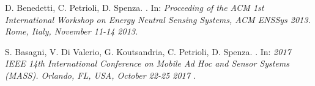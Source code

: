 \documentclass[binding=0.6cm,TFA]{sapthesis}
\begin{document}
\begin{thebibliography}{9}
    D. Benedetti, C. Petrioli, D. Spenza.
    .
    In: \textit{Proceeding of the ACM 1st International Workshop on Energy Neutral Sensing Systems, ACM ENSSys 2013. Rome, Italy, November 11-14 2013.}

    S. Basagni, V. Di Valerio, G. Koutsandria, C. Petrioli, D. Spenza.
    .
    In: \textit{2017 IEEE 14th International Conference on Mobile Ad Hoc and Sensor Systems (MASS). Orlando, FL, USA, October 22-25 2017    .}

\end{thebibliography}
\end{document}
